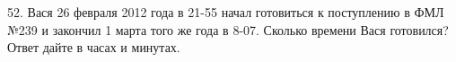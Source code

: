52. Вася 26 февраля 2012 года в 21-55 начал готовиться к поступлению в ФМЛ №239 и закончил 1 марта того же года в 8-07. Сколько времени Вася готовился? Ответ дайте в часах и минутах.\\
